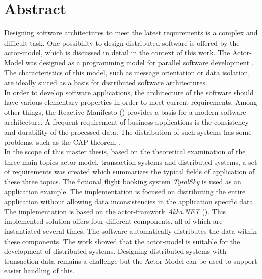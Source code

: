 
\chapter*{Abstract}
Designing software architectures to meet the latest requirements is a complex and difficult task. One possibility to design distributed software is offered by the actor-model, which is discussed in detail in the context of this work. The Actor-Model was designed as a programming model for parallel software development \citep{hewitt1973session}. The characteristics of this model, such as message orientation or data isolation, are ideally suited as a basis for distributed software architectures. \\
In order to develop software applications, the architecture of the software should have various elementary properties in order to meet current requirements. Among other things, the Reactive Manifesto (\cite{reactiveManifesto}) provides a basis for a modern software architecture. 
A frequent requirement of business applications is the consistency and durability of the processed data. The distribution of such systems has some problems, such as the CAP theorem \citep{gilbertPerspectiveCAPTheorem2012}. \\
In the scope of this master thesis, based on the theoretical examination of the three main topics actor-model, transaction-systems and distributed-systems, a set of requirements was created which summarizes the typical fields of application of these three topics. The fictional flight booking system \textit{TyrolSky} is used as an application example. The implementation is focused on distributing the entire application without allowing data inconsistencies in the application specific data. \\
The implementation is based on the actor-framwork \textit{Akka.NET} (\cite{Akka.NETCommunityAkka.NETDocumentation}). This implemented solution offers four different components, all of which are instantiated several times. The software automatically distributes the data within these components.
The work showed that the actor-model is suitable for the development of distributed systems. Designing distributed systems with transaction data remains a challenge but the Actor-Model can be used to support easier handling of this.


\cleardoublepage
{} %